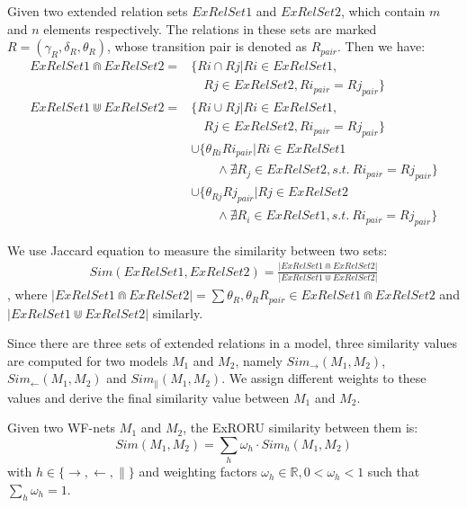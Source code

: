 \documentclass{llncs}
\begin{document}
\begin{definition}\label{def:relSetOperations}
Given two extended relation sets $ExRelSet1$ and $ExRelSet2$, which contain $m$ and $n$ elements respectively. The relations in these sets are marked $R=(\gamma_{R},\delta_{R},\theta_{R})$, whose transition pair is denoted as $R_{pair}$. Then we have:
	\begin{equation}\label{eq:relSetOperations}
		\begin{aligned}
			ExRelSet1\Cap ExRelSet2=&\{Ri\cap Rj|Ri\in ExRelSet1,\\
			&\quad Rj\in ExRelSet2,Ri_{pair}=Rj_{pair}\}\\
			ExRelSet1\Cup ExRelSet2=&\{Ri\cup Rj|Ri\in ExRelSet1,\\
			&\quad Rj\in ExRelSet2,Ri_{pair}=Rj_{pair}\}\\
			&\cup\{\theta_{Ri}Ri_{pair}|Ri\in ExRelSet1\\
			&\qquad \wedge\nexists R_{j}\in ExRelSet2,s.t.~Ri_{pair}=Rj_{pair}\}\\
			&\cup\{\theta_{Rj}Rj_{pair}|Rj\in ExRelSet2\\
			&\qquad \wedge\nexists R_{i}\in ExRelSet1,s.t.~Ri_{pair}=Rj_{pair}\}
		\end{aligned}
	\end{equation}
\end{definition}

We use Jaccard equation to measure the similarity between two sets:
\begin{equation}
	\begin{aligned}
		Sim(ExRelSet1,ExRelSet2)=\frac{|ExRelSet1\Cap ExRelSet2|}{|ExRelSet1\Cup ExRelSet2|}
	\end{aligned}
\end{equation}
, where $|ExRelSet1\Cap ExRelSet2|=\sum\theta_{R},\theta_{R}R_{pair}\in ExRelSet1\Cap ExRelSet2$ and $|ExRelSet1\Cup ExRelSet2|$ similarly.

Since there are three sets of extended relations in a model, three similarity values are computed for two models $M_{1}$ and $M_{2}$, namely $Sim_{\rightarrow}(M_{1},M_{2})$, $Sim_{\leftarrow }(M_{1},M_{2})$ and $Sim_{\parallel}(M_{1},M_{2})$. We assign different weights to these values and derive the final similarity value between $M_{1}$ and $M_{2}$.

\begin{definition}\label{def:similarity}
Given two WF-nets $M_{1}$ and $M_{2}$, the ExRORU similarity between them is:\\
\begin{equation}\label{eq:similarity}
Sim(M_{1},M_{2})=\sum_{h}\omega_{h}\cdot Sim_{h}(M_{1},M_{2})
\end{equation}
with $h\in\{\rightarrow,\leftarrow ,\parallel\}$ and weighting factors $\omega_{h}\in\mathbb{R},0<\omega_{h}<1$ such that $\sum\limits_{h}\omega_{h}=1$.
\end{definition}
\end{document}
